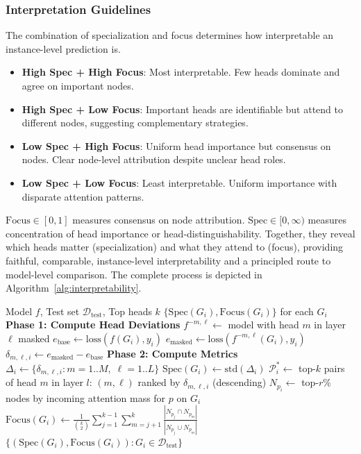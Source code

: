 \documentclass[lettersize,journal]{IEEEtran}
\begin{document}
\subsubsection{Interpretation Guidelines}
The combination of specialization and focus determines how interpretable an instance-level prediction is.
\begin{itemize}
    \item \textbf{High Spec + High Focus}: Most interpretable. Few heads dominate and agree on important nodes.
    \item \textbf{High Spec + Low Focus}: Important heads are identifiable but attend to different nodes, suggesting complementary strategies.
    \item \textbf{Low Spec + High Focus}: Uniform head importance but consensus on nodes. Clear node-level attribution despite unclear head roles.
    \item \textbf{Low Spec + Low Focus}: Least interpretable. Uniform importance with disparate attention patterns.
\end{itemize}
$\mathrm{Focus}\in[0,1]$ measures consensus on node attribution. $\mathrm{Spec}\in[0,\infty)$ measures concentration of head importance or head-distinguishability. Together, they reveal which heads matter (specialization) and what they attend to (focus), providing faithful, comparable, instance-level interpretability and a principled route to model-level comparison. The complete process is depicted in Algorithm~\ref{alg:interpretability}.


\begin{algorithm}[t]
\caption{Graph Transformer Interpretability Analysis}
\label{alg:interpretability}
\begin{algorithmic}[1]
\Require Model $f$, Test set $\mathcal{D}_{\text{test}}$, Top heads $k$
\Ensure $\{\mathrm{Spec}(G_i), \mathrm{Focus}(G_i)\}$ for each $G_i$
\State \textbf{Phase 1: Compute Head Deviations}
        \State $f^{-m,\ell} \gets$ model with head $m$ in layer $\ell$ masked
            \State $e_{\text{base}} \gets \mathrm{loss}\!\left(f(G_i), y_i\right)$
            \State $e_{\text{masked}} \gets \mathrm{loss}\!\left(f^{-m,\ell}(G_i), y_i\right)$
            \State $\delta_{m,\ell,i} \gets e_{\text{masked}} - e_{\text{base}}$
        \EndFor
    \EndFor
\EndFor
\State \textbf{Phase 2: Compute Metrics}
    \State $\Delta_i \gets \{\delta_{m,\ell,i} : m=1..M,\; \ell=1..L\}$
    \State $\mathrm{Spec}(G_i) \gets \mathrm{std}(\Delta_i)$
    \State $\mathcal{P}^*_i \gets$ top-$k$ pairs of head $m$ in layer $l$: $(m,\ell)$ ranked by $\delta_{m,\ell,i}$ (descending)
        \State $N_{p_i} \gets$ top-$r\%$ nodes by incoming attention mass for $p$ on $G_i$ 
    \EndFor
    \State $\mathrm{Focus}(G_i) \gets \frac{1}{\binom{k}{2}}
        \sum_{j=1}^{k-1}\sum_{m=j+1}^{k}
        \frac{|N_{p_j} \cap N_{p_m}|}{|N_{p_j} \cup N_{p_m}|}$
\EndFor
\State \Return $\{(\mathrm{Spec}(G_i), \mathrm{Focus}(G_i)) : G_i \in \mathcal{D}_{\text{test}}\}$
\end{algorithmic}
\end{algorithm}
\end{document}
